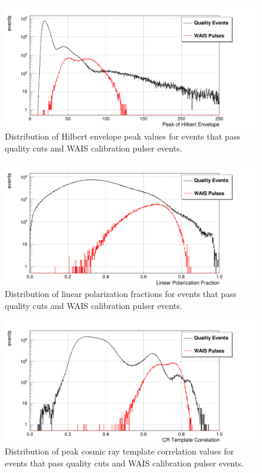\begin{figure}
	\centering
	\includegraphics[width=\textwidth]{figures/hilbertCut}
	\caption{Distribution of Hilbert envelope peak values for events that pass quality cuts and WAIS calibration pulser events.} 
	\label{fig:hilbertCut}
\end{figure}

\begin{figure}
	\centering
	\includegraphics[width=\textwidth]{figures/linPolCut}
	\caption{Distribution of linear polarization fractions for events that pass quality cuts and WAIS calibration pulser events.} 
	\label{fig:linPolCut}
\end{figure}

\begin{figure}
	\centering
	\includegraphics[width=\textwidth]{figures/tempCorrCut}
	\caption{Distribution of peak cosmic ray template correlation values for events that pass quality cuts and WAIS calibration pulser events.} 
	\label{fig:templateCoherCut}
\end{figure}

